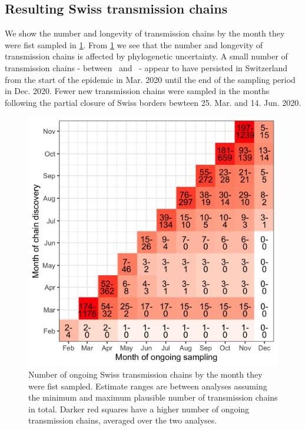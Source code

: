 \documentclass[9pt,twocolumn,twoside,lineno]{pnas-new}
\begin{document}
\subsection{Resulting Swiss transmission chains}
We show the number and longevity of transmission chains by the month they were fist sampled in \ref{fig:chain-longevity}. From \ref{fig:chain-longevity} we see that the number and longevity of transmission chains is affected by phylogenetic uncertainty. A small number of transmission chains - between \nspanningchainsmax\ and \nspanningchainsmin\ - appear to have persisted in Switzerland from the start of the epidemic in Mar. 2020 until the end of the sampling period in Dec. 2020. Fewer new transmission chains were sampled in the months following the partial closure of Swiss borders bewteen 25. Mar. and 14. Jun. 2020. 
\begin{figure}[tbhp]
\centering
\includegraphics[width=.8\linewidth]{figures/chain_longevity_matrix.png}
\caption{Number of ongoing Swiss transmission chains by the month they were fist sampled. Estimate ranges are between analyses assuming the minimum and maximum plausible number of transmission chains in total. Darker red squares have a higher number of ongoing transmission chains, averaged over the two analyses.}
\label{fig:chain-longevity}
\end{figure}
\end{document}
